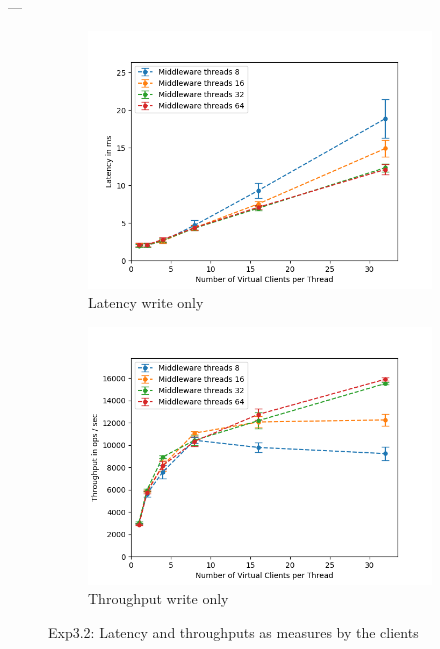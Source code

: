\documentclass[11pt,a4paper]{article}
\begin{document}
---

\begin{figure}[H]
\centering
\begin{subfigure}{.5\textwidth}
    \centering
    \includegraphics[width=\textwidth]{img/exp3_2/exp3_2__latency_client_write_1.png}
    \caption{Latency write only}
    \label{fig:mesh1}
\end{subfigure}%
\begin{subfigure}{.5\textwidth}
      \centering
    \includegraphics[width=\textwidth]{img/exp3_2/exp3_2__throughput_client_write_1.png}
    \caption{Throughput write only}
    \label{fig:mesh1}
\end{subfigure}
\caption{Exp3.2: Latency and throughputs as measures by the clients}
\label{fig:test}
\end{figure}
\end{document}
